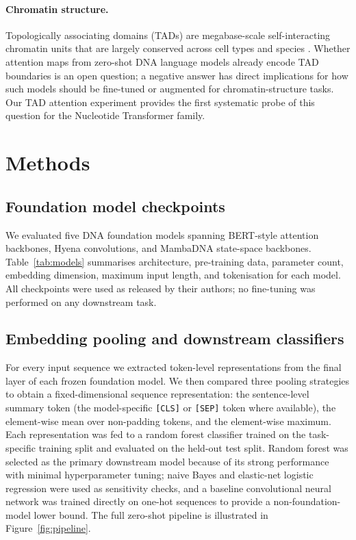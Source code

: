 \documentclass[11pt,a4paper]{article}
\begin{document}
\paragraph{Chromatin structure.}
Topologically associating domains (TADs) are megabase-scale self-interacting chromatin units that are largely conserved across cell types and species \citep{dixon2012topological,lieberman2009hic}. Whether attention maps from zero-shot DNA language models already encode TAD boundaries is an open question; a negative answer has direct implications for how such models should be fine-tuned or augmented for chromatin-structure tasks. Our TAD attention experiment provides the first systematic probe of this question for the Nucleotide Transformer family.

\section{Methods}

\subsection{Foundation model checkpoints}
We evaluated five DNA foundation models spanning BERT-style attention backbones, Hyena convolutions, and MambaDNA state-space backbones. Table~\ref{tab:models} summarises architecture, pre-training data, parameter count, embedding dimension, maximum input length, and tokenisation for each model. All checkpoints were used as released by their authors; no fine-tuning was performed on any downstream task.

\subsection{Embedding pooling and downstream classifiers}
For every input sequence we extracted token-level representations from the final layer of each frozen foundation model. We then compared three pooling strategies to obtain a fixed-dimensional sequence representation: the sentence-level summary token (the model-specific \texttt{[CLS]} or \texttt{[SEP]} token where available), the element-wise mean over non-padding tokens, and the element-wise maximum. Each representation was fed to a random forest classifier \citep{breiman2001random} trained on the task-specific training split and evaluated on the held-out test split. Random forest was selected as the primary downstream model because of its strong performance with minimal hyperparameter tuning; naive Bayes and elastic-net logistic regression were used as sensitivity checks, and a baseline convolutional neural network was trained directly on one-hot sequences to provide a non-foundation-model lower bound. The full zero-shot pipeline is illustrated in Figure~\ref{fig:pipeline}.
\end{document}
